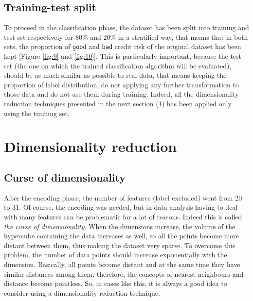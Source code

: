 \documentclass[letterpaper]{article}
\begin{document}
	\subsection{Training-test split}
	To proceed in the classification phase, the dataset has been split into training and test set respectively for $80\%$ and $20\%$ in a stratified way, that means that in both sets, the proportion of \texttt{good} and \texttt{bad} credit risk of the original dataset has been kept [Figure \ref{fig:9} and \ref{fig:10}]. This is particularly important, because the test set (the one on which the trained classification algorithm will be evaluated), should be as much similar as possible to real data, that means keeping the proportion of label distribution, do not applying any further transformation to those data and do not use them during training. Indeed, all the dimensionality reduction techniques presented in the next section (\ref{dim_reduction}) has been applied only using the training set.
	
	\section{Dimensionality reduction} \label{dim_reduction}
	\subsection{Curse of dimensionality}
	After the encoding phase, the number of features (label excluded) went from 20 to 31. Of course, the encoding was needed, but in data analysis having to deal with many features can be problematic for a lot of reasons. Indeed this is called \emph{the curse of dimensionality}. When the dimensions increase, the volume of the hypercube containing the data increases as well, so all the points become more distant between them, thus making the dataset very sparse. To overcome this problem, the number of data points should increase exponentially with the dimension. Basically, all points become distant and at the same time they have similar distances among them; therefore, the concepts of nearest neighbours and distance become pointless. So, in cases like this, it is always a good idea to consider using a dimensionality reduction technique. 
\end{document}
